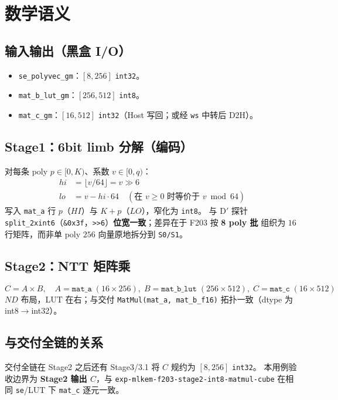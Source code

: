 \documentclass[UTF8,a4paper,11pt]{ctexart}
\begin{document}
\section{数学语义}

\subsection{输入输出（黑盒 I/O）}
\begin{itemize}
  \item \texttt{se\_polyvec\_gm}：$[8,256]$ \texttt{int32}。
  \item \texttt{mat\_b\_lut\_gm}：$[256,512]$ \texttt{int8}。
  \item \texttt{mat\_c\_gm}：$[16,512]$ \texttt{int32}（Host 写回；或经 \texttt{ws} 中转后 D2H）。
\end{itemize}

\subsection{Stage1：6bit limb 分解（编码）}
对每条 poly $p\in[0,K)$、系数 $v\in[0,q)$：
\begin{align}
  hi &= \lfloor v / 64 \rfloor = v \gg 6 \\
  lo &= v - hi \cdot 64 \quad (\text{在 } v\ge 0 \text{ 时等价于 } v \bmod 64)
\end{align}
写入 \texttt{mat\_a} 行 $p$（$HI$）与 $K{+}p$（$LO$），窄化为 \texttt{int8}。
与 D$'$ 探针 \texttt{split\_2xint6}（\texttt{\&0x3f}，\texttt{>>6}）\textbf{位宽一致}；差异在于 F203 按 \textbf{8 poly 批} 组织为 $16$ 行矩阵，而非单 poly $256$ 向量原地拆分到 \texttt{S0/S1}。

\subsection{Stage2：NTT 矩阵乘}
\begin{equation}
  C = A \times B,\quad
  A=\texttt{mat\_a}\;(16\times 256),\;
  B=\texttt{mat\_b\_lut}\;(256\times 512),\;
  C=\texttt{mat\_c}\;(16\times 512)
\end{equation}
$ND$ 布局，LUT 在右；与交付 \texttt{MatMul(mat\_a, mat\_b\_f16)} 拓扑一致（dtype 为 int8$\to$int32）。

\subsection{与交付全链的关系}
交付全链在 Stage2 之后还有 Stage3/3.1 将 $C$ 规约为 $[8,256]$ \texttt{int32}。
本用例验收边界为 \textbf{Stage2 输出 $C$}，与 \texttt{exp-mlkem-f203-stage2-int8-matmul-cube} 在相同 \texttt{se}/LUT 下 \texttt{mat\_c} 逐元一致。
\end{document}
